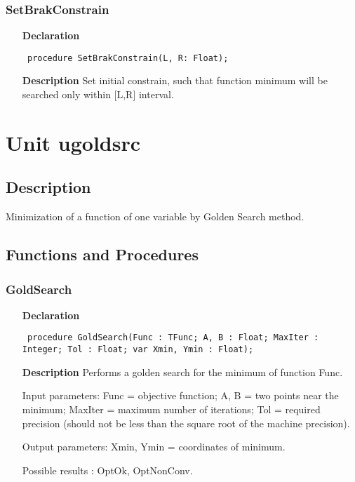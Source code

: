 \documentclass[12pt,a4paper,oneside]{report}
\newcommand{\declarationitem}[1]{\textbf{#1}}
\newcommand{\descriptiontitle}[1]{\textbf{#1}}
\newcommand{\code}[1]{\texttt{#1}}
\begin{document}
\subsubsection{SetBrakConstrain}
\label{uminbrak-SetBrakConstrain}
\begin{itemize}\item[\declarationitem{Declaration}\hfill]
	\begin{flushleft}
		\code{
			procedure SetBrakConstrain(L, R: Float);}
	\end{flushleft}
	\item[\descriptiontitle{Description}]
	Set initial constrain, such that function minimum will be searched only within [L,R] interval. 	
\end{itemize}
\section{Unit ugoldsrc}
\label{ugoldsrc}
\subsection{Description}
Minimization of a function of one variable by Golden Search method.
\subsection{Functions and Procedures}
\subsubsection{GoldSearch}
\label{ugoldsrc-GoldSearch}
\begin{itemize}\item[\declarationitem{Declaration}\hfill]
	\begin{flushleft}
		\code{
			procedure GoldSearch(Func : TFunc; A, B : Float; MaxIter : Integer; Tol : Float; var Xmin, Ymin : Float);}
	\end{flushleft}
	\item[\descriptiontitle{Description}]
	Performs a golden search for the minimum of function Func.
	
	Input parameters: Func = objective function; A, B = two points near the minimum; MaxIter = maximum number of iterations; Tol = required precision (should not be less than the square root of the machine precision).
	
	Output parameters: Xmin, Ymin = coordinates of minimum.
	
	Possible results : OptOk, OptNonConv.
	
\end{itemize}
\end{document}
